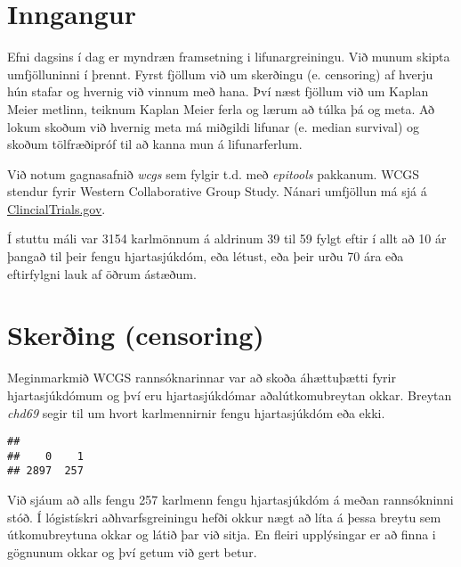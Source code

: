 \documentclass[
]{book}
\newenvironment{Shaded}{\begin{snugshade}}{\end{snugshade}}
\newcommand{\KeywordTok}[1]{\textcolor[rgb]{0.13,0.29,0.53}{\textbf{#1}}}
\newcommand{\NormalTok}[1]{#1}
\newcommand{\OperatorTok}[1]{\textcolor[rgb]{0.81,0.36,0.00}{\textbf{#1}}}
\begin{document}
\hypertarget{inngangur}{%
\section{Inngangur}\label{inngangur}}

Efni dagsins í dag er myndræn framsetning i lifunargreiningu. Við munum skipta umfjölluninni í þrennt. Fyrst fjöllum við um skerðingu (e. censoring) af hverju hún stafar og hvernig við vinnum með hana. Því næst fjöllum við um Kaplan Meier metlinn, teiknum Kaplan Meier ferla og lærum að túlka þá og meta. Að lokum skoðum við hvernig meta má miðgildi lifunar (e. median survival) og skoðum tölfræðipróf til að kanna mun á lifunarferlum.

Við notum gagnasafnið \emph{wcgs} sem fylgir t.d. með \emph{epitools} pakkanum. WCGS stendur fyrir Western Collaborative Group Study. Nánari umfjöllun má sjá á \href{http://clinicaltrials.gov/show/NCT00005174}{ClincialTrials.gov}.

Í stuttu máli var 3154 karlmönnum á aldrinum 39 til 59 fylgt eftir í allt að 10 ár þangað til þeir fengu hjartasjúkdóm, eða létust, eða þeir urðu 70 ára eða eftirfylgni lauk af öðrum ástæðum.

\hypertarget{skeruxf0ing-censoring}{%
\section{Skerðing (censoring)}\label{skeruxf0ing-censoring}}

Meginmarkmið WCGS rannsóknarinnar var að skoða áhættuþætti fyrir hjartasjúkdómum og því eru hjartasjúkdómar aðalútkomubreytan okkar. Breytan \emph{chd69} segir til um hvort karlmennirnir fengu hjartasjúkdóm eða ekki.

\begin{Shaded}
\end{Shaded}

\begin{verbatim}
## 
##    0    1 
## 2897  257
\end{verbatim}

Við sjáum að alls fengu 257 karlmenn fengu hjartasjúkdóm á meðan rannsókninni stóð. Í lógistískri aðhvarfsgreiningu hefði okkur nægt að líta á þessa breytu sem útkomubreytuna okkar og látið þar við sitja. En fleiri upplýsingar er að finna i gögnunum okkar og því getum við gert betur.
\end{document}
